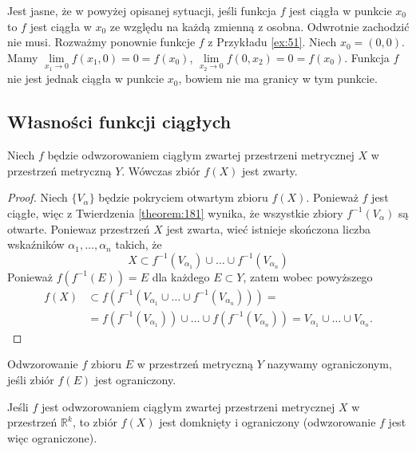 \documentclass[leqno]{article}
\begin{document}
\begin{justify}
Jest jasne, że w powyżej opisanej sytuacji, jeśli funkcja $f$ jest ciągła w punkcie $x_0$ to $f$ jest ciągła w $x_0$ ze względu na każdą zmienną z osobna.
Odwrotnie zachodzić nie musi. Rozważmy ponownie funkcje $f$ z Przykładu \ref{ex:51}. Niech $x_0 = (0, 0)$.
Mamy $\lim\limits_{x_1 \to 0}f(x_1, 0) = 0 = f(x_0)$, $\lim\limits_{x_2 \to 0}f(0, x_2) = 0 = f(x_0)$. Funkcja $f$ nie jest jednak ciągła w punkcie $x_0$, 
bowiem nie ma granicy w tym punkcie.

\subsection{Własności funkcji ciągłych}

\begin{theorem}
{
    Niech $f$ będzie odwzorowaniem ciągłym zwartej przestrzeni metrycznej $X$ w przestrzeń metryczną $Y$.
    Wówczas zbiór $f(X)$ jest zwarty. 
}
\end{theorem}

\begin{proof}
    Niech $\{V_\alpha\}$ będzie pokryciem otwartym zbioru $f(X)$. Ponieważ $f$ jest ciągłe, więc z Twierdzenia \ref{theorem:181} wynika, że wszystkie 
    zbiory $f^{-1}(V_\alpha)$ są otwarte. Poniewaz przestrzeń $X$ jest zwarta, wieć istnieje skończona liczba wskaźników $\alpha_1, \ldots, \alpha_n$ takich, że 
    \[
        X \subset f^{-1}(V_{\alpha_1}) \cup \ldots \cup f^{-1}(V_{\alpha_n})
    \]
    Ponieważ $f(f^{-1}(E)) = E$ dla każdego $E \subset Y$, zatem wobec powyższego 
    \begin{align*}
        f(X) &\subset f(f^{-1}(V_{\alpha_1} \cup \ldots \cup f^{-1}(V_{\alpha_n}))) = \\
        & = f(f^{-1}(V_{\alpha_1})) \cup \ldots \cup f(f^{-1}(V_{\alpha_n})) = V_{\alpha_1} \cup \ldots \cup V_{\alpha_n}.
    \end{align*}
\end{proof}

\begin{defn}
    Odwzorowanie $f$ zbioru $E$ w przestrzeń metryczną $Y$ nazywamy ograniczonym, jeśli zbiór $f(E)$ jest ograniczony.
\end{defn}

\begin{theorem}
{
    Jeśli $f$ jest odwzorowaniem ciągłym zwartej przestrzeni metrycznej $X$ w przestrzeń $\mathbb{R}^k$, to zbiór $f(X)$ jest domknięty
    i ograniczony (odwzorowanie $f$ jest więc ograniczone).
}
\end{theorem}


\end{justify}
\end{document}
